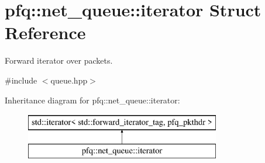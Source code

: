 \hypertarget{structpfq_1_1net__queue_1_1iterator}{\section{pfq\+:\+:net\+\_\+queue\+:\+:iterator Struct Reference}
\label{structpfq_1_1net__queue_1_1iterator}
}


Forward iterator over packets.  




{\ttfamily \#include $<$queue.\+hpp$>$}

Inheritance diagram for pfq\+:\+:net\+\_\+queue\+:\+:iterator\+:\begin{figure}[H]
\begin{center}
\leavevmode
\includegraphics[height=2.000000cm]{structpfq_1_1net__queue_1_1iterator}
\end{center}
\end{figure}
